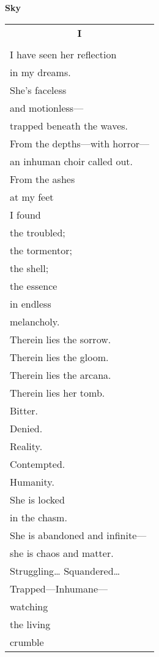 \documentclass{article}
\begin{document}
\newcommand{\h}{\hspace*{2ex}}
\newcommand{\HHHH}{\hspace*{32ex}}
\begin{center}
{\large\textbf{Sky}} \\
\begin{tabular}{l}
\multicolumn{1}{c}{\large\textbf{I}} \\
\\
I have seen her reflection \\
\h in my dreams. \\
She's faceless \\
\h and motionless--- \\
\h\h trapped beneath the waves. \\ %
From the depths---with horror--- \\
\h an inhuman choir called out. \\ %
From the ashes \\
\h at my feet \\
\h\h I found \\
the troubled; \\
\h the tormentor; \\
\h\h the shell; \\
\h\h\h the essence \\ %
in endless \\
\h melancholy.\\
Therein lies the sorrow. \\
Therein lies the gloom. \\
Therein lies the arcana. \\
Therein lies her tomb. \\
\h Bitter. \\
\h\h Denied. \\
\h\h\h Reality. \\
\h Contempted. \\
\h\h Humanity. \\
She is locked \\
\h in the chasm. \\
She is abandoned and infinite--- \\
\h she is chaos and matter. \\ %
Struggling\ldots{} Squandered\ldots \\
\h Trapped---Inhumane--- \\
\h\h watching \\
\h\h\h the living \\
\h\h\h\h crumble \\

\end{tabular}
\end{center}
\end{document}
